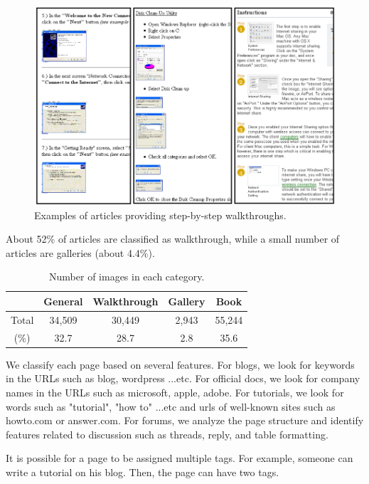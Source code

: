 \documentclass{www2010-submission}
\begin{document}
\begin{figure}
\includegraphics[width=1\columnwidth]{figure/walkthrough_examples.png}
\caption{Examples of articles providing step-by-step walkthroughs.}
\end{figure}


About 52\% of articles are classified as walkthrough, while a
small number of articles are galleries (about 4.4\%).

\begin{table}
\centering \caption{Number of images in each category.} \label{}

\begin{tabular}{|c|c|c|c|c|}
\hline
      & General & Walkthrough & Gallery & Book \\
\hline
Total & 34,509 & 30,449 & 2,943 & 55,244\\
 \hline
(\%)  & 32.7 & 28.7 & 2.8 & 35.6 \\
\hline
\end{tabular}
\end{table}


We classify each page based on several features. For blogs, we
look for keywords in the URLs such as blog, wordpress ...etc. For
official docs, we look for company names in the URLs such as
microsoft, apple, adobe. For tutorials, we look for words such as
"tutorial", "how to" ...etc and urls of well-known sites such as
howto.com or answer.com. For forums, we analyze the page structure
and identify features related to discussion such as threads,
reply, and table formatting.

It is possible for a page to be assigned multiple tags. For
example, someone can write a tutorial on his blog. Then, the page
can have two tags.
\end{document}
